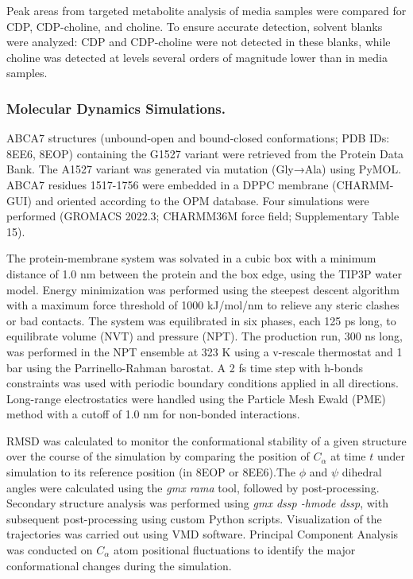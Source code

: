 Peak areas from targeted metabolite analysis of media samples were compared for CDP, CDP-choline, and choline. To ensure accurate detection, solvent blanks were analyzed: CDP and CDP-choline were not detected in these blanks, while choline was detected at levels several orders of magnitude lower than in media samples.

\subsubsection{Molecular Dynamics Simulations.}
ABCA7 structures (unbound-open and bound-closed conformations; PDB IDs: 8EE6, 8EOP) containing the G1527 variant were retrieved from the Protein Data Bank. The A1527 variant was generated via mutation (Gly→Ala) using PyMOL. ABCA7 residues 1517-1756 were embedded in a DPPC membrane (CHARMM-GUI) and oriented according to the OPM database. Four simulations were performed (GROMACS 2022.3; CHARMM36M force field; Supplementary Table 15).

The protein-membrane system was solvated in a cubic box with a minimum distance of 1.0 nm between the protein and the box edge, using the TIP3P water model. Energy minimization was performed using the steepest descent algorithm with a maximum force threshold of 1000 kJ/mol/nm to relieve any steric clashes or bad contacts. The system was equilibrated in six phases, each 125 ps long, to equilibrate volume (NVT) and pressure (NPT). The production run, 300 ns long, was performed in the NPT ensemble at 323 K using a v-rescale thermostat and 1 bar using the Parrinello-Rahman barostat. A 2 fs time step with h-bonds constraints was used with periodic boundary conditions applied in all directions. Long-range electrostatics were handled using the Particle Mesh Ewald (PME) method with a cutoff of 1.0 nm for non-bonded interactions. 
 
RMSD was calculated to monitor the conformational stability of a given structure over the course of the simulation by comparing the position of $C_\alpha$ at time $t$ under simulation to its reference position (in 8EOP or 8EE6).The $\phi$ and $\psi$ dihedral angles were calculated using the \textit{gmx rama} tool, followed by post-processing. Secondary structure analysis was performed using \textit{gmx dssp -hmode dssp}, with subsequent post-processing using custom Python scripts. Visualization of the trajectories was carried out using VMD software. Principal Component Analysis was conducted on $C_\alpha$ atom positional fluctuations  to identify the major conformational changes during the simulation. 

